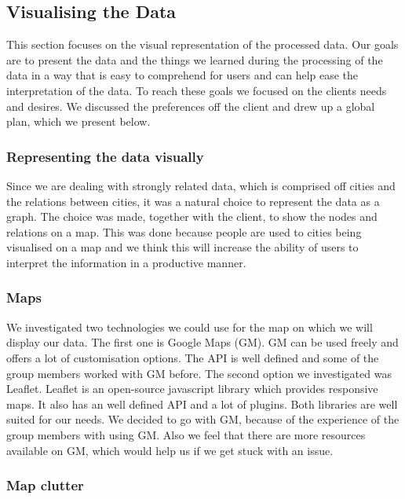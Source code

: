 \subsection{Visualising the Data}

This section focuses on the visual representation of the processed data. Our goals are to present the data and the things we learned during the processing of the data in a way that is easy to comprehend for users and can help ease the interpretation of the data.
To reach these goals we focused on the clients needs and desires. We discussed the preferences off the client and drew up a global plan, which we present below.

\subsubsection{Representing the data visually}

Since we are dealing with strongly related data, which is comprised off cities and the relations between cities, it was a natural choice to represent the data as a graph.
The choice was made, together with the client, to show the nodes and relations on a map. This was done because people are used to cities being visualised on a map and we think this will increase the ability of users to interpret the information in a productive manner.

\subsubsection{Maps}

We investigated two technologies we could use for the map on which we will display our data. The first one is Google Maps (GM). GM can be used freely and offers a lot of customisation options. The API is well defined and some of the group members worked with GM before. The second option we investigated was Leaflet. Leaflet is an open-source javascript library which provides responsive maps. It also has an well defined API and a lot of plugins.
Both libraries are well suited for our needs. 
We decided to go with GM, because of the experience of the group members with using GM. Also we feel that there are more resources available on GM, which would help us if we get stuck with an issue.

\subsubsection{Map clutter}

